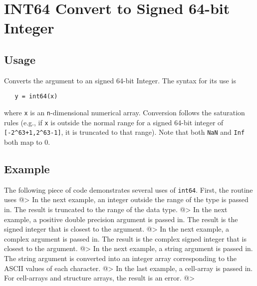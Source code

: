 \section{INT64 Convert to Signed 64-bit Integer}

\subsection{Usage}

Converts the argument to an signed 64-bit Integer.  The syntax
for its use is
\begin{verbatim}
   y = int64(x)
\end{verbatim}
where \verb|x| is an \verb|n|-dimensional numerical array.  Conversion
follows the saturation rules (e.g., if \verb|x| is outside the normal
range for a signed 64-bit integer of \verb|[-2^63+1,2^63-1]|, it is
truncated to that range).  Note that both \verb|NaN| and \verb|Inf| both map to 0.
\subsection{Example}

The following piece of code demonstrates several uses of \verb|int64|.  First, the routine uses
@>
In the next example, an integer outside the range  of the type is passed in.  
The result is truncated to the range of the data type.
@>
In the next example, a positive double precision argument is passed in.  The 
result is the signed integer that is closest to the argument.
@>
In the next example, a complex argument is passed in.  The result is the 
complex signed integer that is closest to the argument.
@>
In the next example, a string argument is passed in.  The string argument is 
converted into an integer array corresponding to the ASCII values of each character.
@>
In the last example, a cell-array is passed in.  For cell-arrays and structure 
arrays, the result is an error.
@>
